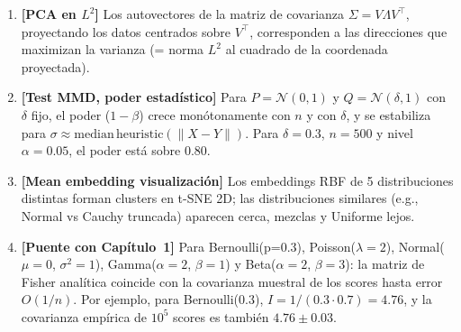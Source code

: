 \begin{enumerate}
	\item \textbf{[PCA en $L^2$]} Los autovectores de la matriz de covarianza $\Sigma = V\Lambda V^\top$, proyectando los datos centrados sobre $V^\top$, corresponden a las direcciones que maximizan la varianza (= norma $L^2$ al cuadrado de la coordenada proyectada).

	\item \textbf{[Test MMD, poder estadístico]} Para $P=\mathcal{N}(0,1)$ y $Q=\mathcal{N}(\delta,1)$ con $\delta$ fijo, el poder ($1-\beta$) crece monótonamente con $n$ y con $\delta$, y se estabiliza para $\sigma\approx\mathrm{median\,heuristic}(\|X-Y\|)$. Para $\delta=0.3$, $n=500$ y nivel $\alpha=0.05$, el poder está sobre $0.80$.

	\item \textbf{[Mean embedding visualización]} Los embeddings RBF de 5 distribuciones distintas forman clusters en t-SNE 2D; las distribuciones similares (e.g., Normal vs Cauchy truncada) aparecen cerca, mezclas y Uniforme lejos.

	\item \textbf{[Puente con Capítulo~1]} Para Bernoulli(p=0.3), Poisson($\lambda=2$), Normal($\mu=0$, $\sigma^2=1$), Gamma($\alpha=2$, $\beta=1$) y Beta($\alpha=2$, $\beta=3$): la matriz de Fisher analítica coincide con la covarianza muestral de los scores hasta error $O(1/n)$. Por ejemplo, para Bernoulli(0.3), $I = 1/(0.3\cdot 0.7) = 4.76$, y la covarianza empírica de $10^5$ scores es también $4.76 \pm 0.03$.
\end{enumerate}
